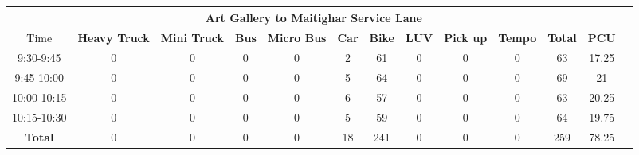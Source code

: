 \begin{landscape}
\begin{table}[h!]
\vspace{0.5cm}
\begin{tabular}{|c|c|c|c|c|c|c|c|c|c|c|c|c|}
    \hline
    \multicolumn{12}{|c|}{\textbf{Art Gallery to Maitighar Service Lane}} \\
    \hline
        Time & \textbf{Heavy Truck} & \textbf{Mini Truck} & \textbf{Bus} & \textbf{Micro Bus} & \textbf{Car} & \textbf{Bike} & \textbf{LUV} & \textbf{Pick up} & \textbf{Tempo} & \textbf{\textbf{Total}} & \textbf{PCU} \\
    \hline
9:30-9:45	&0	&0	&0	&0	&2	&61	&0	&0	&0	&63	&17.25 \\ \hline
9:45-10:00	&0	&0	&0	&0	&5	&64	&0	&0	&0	&69	&21 \\ \hline
10:00-10:15	&0	&0	&0	&0	&6	&57	&0	&0	&0	&63	&20.25 \\ \hline
10:15-10:30	&0	&0	&0	&0	&5	&59	&0	&0	&0	&64	&19.75 \\ \hline
\textbf{Total}	&0	&0	&0	&0	&18	&241	&0	&0	&0	&259	&78.25 \\ \hline

\end{tabular}

\end{table}
\end{landscape}



